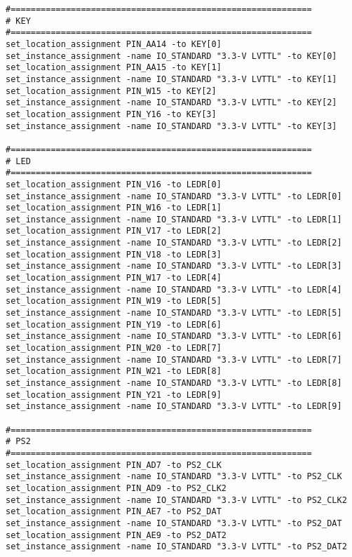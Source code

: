 \begin{verbatim}
#============================================================
# KEY
#============================================================
set_location_assignment PIN_AA14 -to KEY[0]
set_instance_assignment -name IO_STANDARD "3.3-V LVTTL" -to KEY[0]
set_location_assignment PIN_AA15 -to KEY[1]
set_instance_assignment -name IO_STANDARD "3.3-V LVTTL" -to KEY[1]
set_location_assignment PIN_W15 -to KEY[2]
set_instance_assignment -name IO_STANDARD "3.3-V LVTTL" -to KEY[2]
set_location_assignment PIN_Y16 -to KEY[3]
set_instance_assignment -name IO_STANDARD "3.3-V LVTTL" -to KEY[3]

#============================================================
# LED
#============================================================
set_location_assignment PIN_V16 -to LEDR[0]
set_instance_assignment -name IO_STANDARD "3.3-V LVTTL" -to LEDR[0]
set_location_assignment PIN_W16 -to LEDR[1]
set_instance_assignment -name IO_STANDARD "3.3-V LVTTL" -to LEDR[1]
set_location_assignment PIN_V17 -to LEDR[2]
set_instance_assignment -name IO_STANDARD "3.3-V LVTTL" -to LEDR[2]
set_location_assignment PIN_V18 -to LEDR[3]
set_instance_assignment -name IO_STANDARD "3.3-V LVTTL" -to LEDR[3]
set_location_assignment PIN_W17 -to LEDR[4]
set_instance_assignment -name IO_STANDARD "3.3-V LVTTL" -to LEDR[4]
set_location_assignment PIN_W19 -to LEDR[5]
set_instance_assignment -name IO_STANDARD "3.3-V LVTTL" -to LEDR[5]
set_location_assignment PIN_Y19 -to LEDR[6]
set_instance_assignment -name IO_STANDARD "3.3-V LVTTL" -to LEDR[6]
set_location_assignment PIN_W20 -to LEDR[7]
set_instance_assignment -name IO_STANDARD "3.3-V LVTTL" -to LEDR[7]
set_location_assignment PIN_W21 -to LEDR[8]
set_instance_assignment -name IO_STANDARD "3.3-V LVTTL" -to LEDR[8]
set_location_assignment PIN_Y21 -to LEDR[9]
set_instance_assignment -name IO_STANDARD "3.3-V LVTTL" -to LEDR[9]

#============================================================
# PS2
#============================================================
set_location_assignment PIN_AD7 -to PS2_CLK
set_instance_assignment -name IO_STANDARD "3.3-V LVTTL" -to PS2_CLK
set_location_assignment PIN_AD9 -to PS2_CLK2
set_instance_assignment -name IO_STANDARD "3.3-V LVTTL" -to PS2_CLK2
set_location_assignment PIN_AE7 -to PS2_DAT
set_instance_assignment -name IO_STANDARD "3.3-V LVTTL" -to PS2_DAT
set_location_assignment PIN_AE9 -to PS2_DAT2
set_instance_assignment -name IO_STANDARD "3.3-V LVTTL" -to PS2_DAT2


\end{verbatim}
